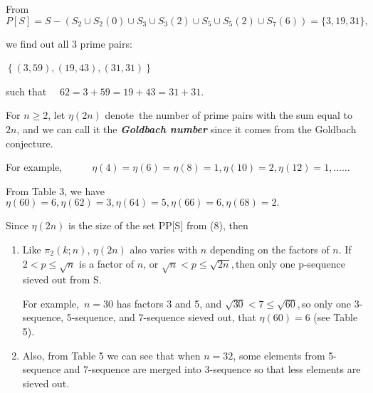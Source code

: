 \documentclass{aomart}
\begin{document}
\vspace{1\baselineskip}

From 
\[
P[S] = S - \left( S_{2} \cup S_{2}(0) \cup S_{3} \cup S_{3}(2) \cup S_{5} \cup S_{5}(2) \cup S_{7}(6) \right) = \{ 3, 19, 31 \},
\]


\vspace{1\baselineskip}

we find out all 3 prime pairs:

\(\left\{\left(3, 59\right),\left(19, 43\right),\left(31, 31\right)\right\}\) \textit{\ \ \ \ }
\vspace{1\baselineskip}

such that \ \ \( 62 = 3+59 = 19+43 = 31+31\).

\vspace{1\baselineskip}

For \( n\geq 2\), let \( \eta (2n)\) denote the number of prime pairs with the sum equal to \( 2n\),  and we can call it the \textbf{\textit{Goldbach number}} since it comes from the Goldbach conjecture. 

\vspace{1\baselineskip}

For example,\ \ \ \ \ \ \( \eta\left(4\right) = \eta\left(6\right) = \eta\left(8\right) = 1,  \eta\left(10\right) = 2,  \eta\left(12\right) = 1, \ldots \ldots\)
\vspace{1\baselineskip}

From Table 3, we have \( \eta\left(60\right) = 6,  \eta\left(62\right) = 3,  \eta\left(64\right) = 5,  \eta\left(66\right) = 6,  \eta\left(68\right) = 2.\)

\vspace{1\baselineskip}


Since \( \eta (2n)\)\textit{ }is the size of the set PP[S] from (8), then 

\begin{enumerate}
	\item Like \( \pi_{2}\left(k;n\right)\),\textbf{ }\( \eta (2n)\)\textbf{ }also\textbf{ }varies with \( n\) depending on the factors of \( n\).  If \( 2<p\leq\sqrt{n}\) is a factor of \( n\),  or \(\sqrt{n}<p\leq\sqrt{2n} , \)then only one p-sequence sieved out from S.  

\vspace{1\baselineskip}
 For example,\ \( n = 30\) has factors 3 and 5, and \(\sqrt{30}<7\leq\sqrt{60} , \)so only one 3-sequence, 5-sequence, and 7-sequence sieved out, that \( \eta\left(60\right) = 6\) (see Table 5).  
 
\vspace{1\baselineskip}

	\item Also, from Table 5 we can see that when \( n = 32\), some elements from 5-sequence and 7-sequence are merged into 3-sequence so that less elements are sieved out.

\end{enumerate}
\end{document}
